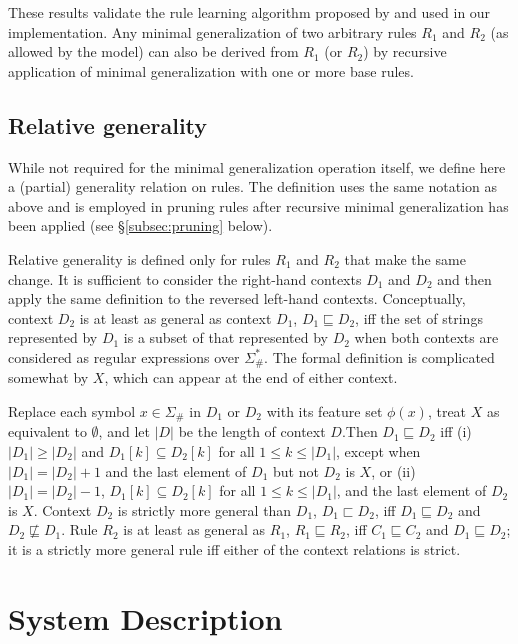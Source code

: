 \documentclass[11pt]{article}
\begin{document}
These results validate the rule learning algorithm proposed by \citet{albright-hayes-2002-modeling} and used in our implementation. Any minimal generalization of two arbitrary rules $R_1$ and $R_2$ (as allowed by the model) can also be derived from $R_1$ (or $R_2$) by recursive application of minimal generalization with one or more base rules.


\subsection{Relative generality}
\label{subsec:generality}

While not required for the minimal generalization operation itself, we define here a (partial) generality relation on rules. The definition uses the same notation as above and is employed in pruning rules after recursive minimal generalization has been applied (see \S\ref{subsec:pruning} below). 

Relative generality is defined only for rules $R_1$ and $R_2$ that make the same change. It is sufficient to consider the right-hand contexts $D_1$ and $D_2$ and then apply the same definition to the reversed left-hand contexts. Conceptually, context $D_2$ is at least as general as context $D_1$, $D_1 \sqsubseteq D_2$, iff the set of strings represented by $D_1$ is a subset of that represented by $D_2$ when both contexts are considered as regular expressions over $\Sigma_{\#}^*$. The formal definition is complicated somewhat by $X$, which can appear at the end of either context.

Replace each symbol $x \in \Sigma_{\#}$ in $D_1$ or $D_2$ with its feature set $\phi(x)$, treat $X$ as equivalent to $\emptyset$, and let $|D|$ be the length of context $D$.Then $D_1 \sqsubseteq D_2$ iff (i) $|D_1| \geq |D_2|$ and $D_1[k] \subseteq D_2[k]$ for all $1 \leq k \leq |D_1|$, except when $|D_1| = |D_2| + 1$ and the last element of $D_1$ but not $D_2$ is $X$, or (ii) $|D_1| = |D_2| - 1$, $D_1[k] \subseteq D_2[k]$ for all $1 \leq k \leq |D_1|$, and the last element of $D_2$ is $X$. Context $D_2$ is strictly more general than $D_1$, $D_1 \sqsubset D_2$, iff $D_1 \sqsubseteq D_2$ and $D_2 \not\sqsubseteq D_1$. Rule $R_2$ is at least as general as $R_1$, $R_1 \sqsubseteq R_2$, iff $C_1 \sqsubseteq C_2$ and $D_1 \sqsubseteq D_2$; it is a strictly more general rule iff either of the context relations is strict.


\section{System Description}
\end{document}
